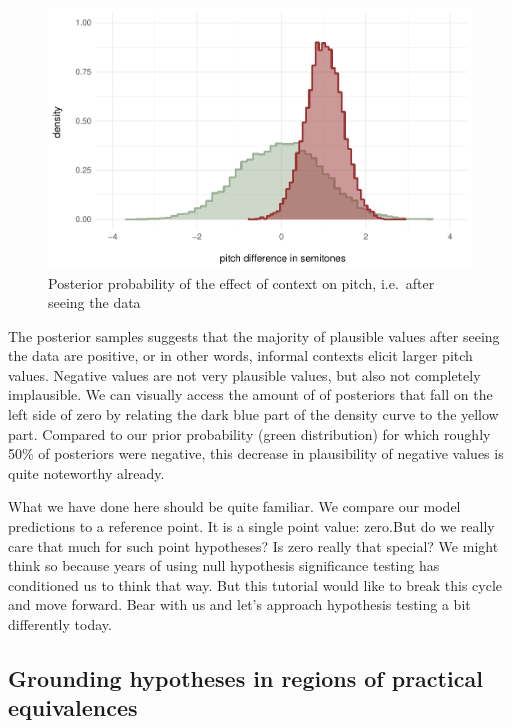 \documentclass[
  doc,
  longtable,
  nolmodern,
  notxfonts,
  notimes,
  colorlinks=true,linkcolor=blue,citecolor=blue,urlcolor=blue]{apa7}
\begin{document}
\begin{figure}[H]

\caption{Posterior probability of the effect of context on pitch,
i.e.~after seeing the data}

{\centering \includegraphics{manuscript_files/figure-pdf/plot-posterior-1.pdf}

}

\end{figure}%

The posterior samples suggests that the majority of plausible values
after seeing the data are positive, or in other words, informal contexts
elicit larger pitch values. Negative values are not very plausible
values, but also not completely implausible. We can visually access the
amount of of posteriors that fall on the left side of zero by relating
the dark blue part of the density curve to the yellow part. Compared to
our prior probability (green distribution) for which roughly 50\% of
posteriors were negative, this decrease in plausibility of negative
values is quite noteworthy already.

What we have done here should be quite familiar. We compare our model
predictions to a reference point. It is a single point value: zero.But
do we really care that much for such point hypotheses? Is zero really
that special? We might think so because years of using null hypothesis
significance testing has conditioned us to think that way. But this
tutorial would like to break this cycle and move forward. Bear with us
and let's approach hypothesis testing a bit differently today.

\subsection{Grounding hypotheses in regions of practical
equivalences}\label{grounding-hypotheses-in-regions-of-practical-equivalences}
\end{document}
